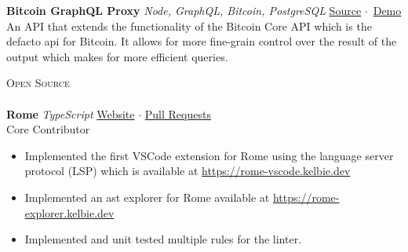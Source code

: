 \documentclass[a4paper]{article}
\newcommand{\lineunder} {
    \vspace*{-8pt} \\
    \hspace*{-18pt} \hrulefill \\
}
\newcommand{\header} [1] {
    {\hspace*{-18pt}\vspace*{6pt} \textsc{#1}}
    \vspace*{-6pt} \lineunder
}
\begin{document}
{\textbf{Bitcoin GraphQL Proxy}} {\sl Node, GraphQL, Bitcoin, PostgreSQL} \hfill \href{https://bitcoin-vscode.kelbie.dev}{Source} $\cdot$ \href{https://bitcoin-vscode.kelbie.dev}{Demo}\\
An API that extends the functionality of the Bitcoin Core API which is the defacto api for Bitcoin. It allows for more fine-grain control over the result of the output which makes for more efficient queries.\
\vspace*{2mm}




\header{Open Source}
\textbf{Rome}  {\sl TypeScript} \hfill \href{https://romefrontend.dev/}{Website} $\cdot$  \href{https://github.com/romefrontend/rome/pulls?q=is\%3Apr+is\%3Amerged+author\%3AKelbie}{Pull Requests} \\
Core Contributor\\
\vspace*{-1mm}
\begin{itemize} \itemsep 1pt
	\item Implemented the first VSCode extension for Rome using the language server protocol (LSP) which is available at \href{https://rome-vscode.kelbie.dev}{https://rome-vscode.kelbie.dev}
	\item Implemented an ast explorer for Rome available at \href{https://rome-explorer.kelbie.dev}{https://rome-explorer.kelbie.dev}
	\item Implemented and unit tested multiple rules for the linter.
\end{itemize}
\vspace*{2mm}
\end{document}
